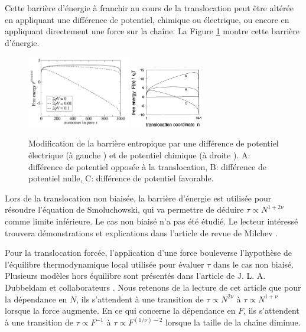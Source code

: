 \documentclass[a4paper,11pt]{article}
\begin{document}
Cette barrière d'énergie à franchir au cours de la translocation peut être altérée en appliquant une différence de potentiel, chimique ou électrique, ou encore en appliquant directement une force sur la chaîne. La Figure \ref{energiebarrier} montre cette barrière d'énergie.
\begin{figure}[H]
\begin{center}
\includegraphics[width=0.4\textwidth]{transelec.jpg} \includegraphics[width=0.28\textwidth]{transpotchim.jpg}

\caption{Modification de la barrière entropique par une différence de potentiel électrique (à gauche \cite{these}) et de potentiel chimique (à droite \cite{sung}). A: différence de potentiel opposée à la translocation, B: différence de potentiel nulle, C: différence de potentiel favorable.}
\label{energiebarrier}
\end{center}
\end{figure}

 Lors de la translocation non biaisée, la barrière d'énergie est utilisée pour résoudre l'équation de Smoluchowski, qui va permettre de déduire $\tau \propto N^{1+2\nu}$ comme limite inférieure. Le cas non biaisé n'a pas été étudié. Le lecteur intéressé trouvera démonstrations et explications dans l'article de revue de Milchev \cite{milchev}.
 
 Pour la translocation forcée, l'application d'une force bouleverse l'hypothèse de l'équilibre thermodynamique local utilisée pour évaluer $\tau$ dans le cas non biaisé. Plusieurs modèles hors équilibre sont présentés dans l'article de J. L. A. Dubbeldam et collaborateurs \cite{traction}. Nous retenons de la lecture de cet article que pour la dépendance en $N$, ils s'attendent à une transition de $\tau \propto N^{2\nu}$ à $\tau \propto N^{1+\nu}$ lorsque la force augmente. En ce qui concerne la dépendance en $F$, ils s'attendent à une transition de $\tau \propto F^{-1}$ à $\tau \propto F^{(1/\nu)-2}$ lorsque la taille de la chaîne diminue.
\end{document}
